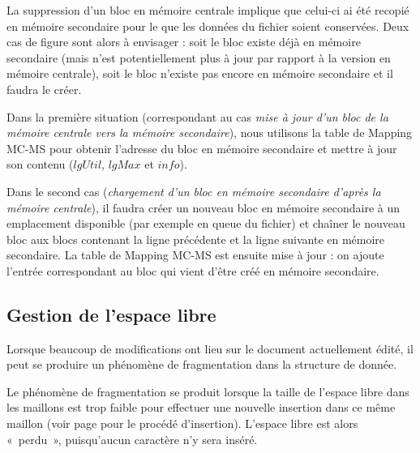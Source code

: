 La suppression d'un bloc en mémoire centrale implique que celui-ci ai été
recopié en mémoire secondaire pour le que les données du fichier soient
conservées. Deux cas de figure sont alors à envisager : soit le bloc existe
déjà en mémoire secondaire (mais n'est potentiellement plus à jour par rapport
à la version en mémoire centrale), soit le bloc n'existe pas encore en mémoire
secondaire et il faudra le créer.

Dans la première situation (correspondant au cas \emph{mise à jour d'un bloc de la mémoire
centrale vers la mémoire secondaire}), nous utilisons la table de
Mapping MC-MS pour obtenir l'adresse du bloc en mémoire secondaire et mettre
à jour son contenu ($lgUtil$, $lgMax$ et $info$).

Dans le second cas (\emph{chargement d'un bloc en mémoire secondaire d'après la mémoire centrale}),
il faudra créer un nouveau bloc en mémoire secondaire à un emplacement disponible (par exemple
en queue du fichier) et chaîner le nouveau bloc aux blocs contenant la ligne précédente et
la ligne suivante en mémoire secondaire. La table de Mapping MC-MS est ensuite mise à jour :
on ajoute l'entrée correspondant au bloc qui vient d'être créé en mémoire secondaire.


\subsection{Gestion de l'espace libre}
	\label{subsec:gestionespacelibre}
Lorsque beaucoup de modifications ont lieu sur le document actuellement édité,
il peut se produire un phénomène de fragmentation dans la structure de
donnée.

Le phénomène de fragmentation se produit lorsque la taille de l'espace libre
dans les maillons est trop faible pour effectuer une nouvelle insertion dans ce
même maillon (voir page \pageref{sec:structurationligne} pour le procédé
d'insertion). L'espace libre est alors «~perdu~», puisqu'aucun caractère n'y
sera inséré.

